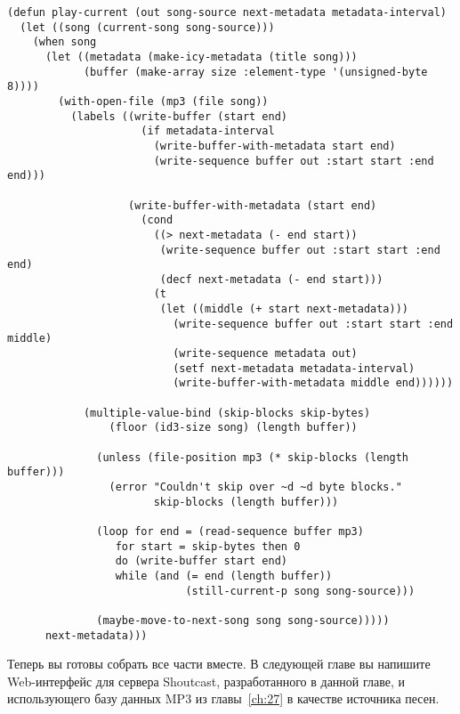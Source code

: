 \begin{lstlisting}
(defun play-current (out song-source next-metadata metadata-interval)
  (let ((song (current-song song-source)))
    (when song
      (let ((metadata (make-icy-metadata (title song)))
            (buffer (make-array size :element-type '(unsigned-byte 8))))
        (with-open-file (mp3 (file song))
          (labels ((write-buffer (start end)
                     (if metadata-interval
                       (write-buffer-with-metadata start end)
                       (write-sequence buffer out :start start :end end)))

                   (write-buffer-with-metadata (start end)
                     (cond
                       ((> next-metadata (- end start))
                        (write-sequence buffer out :start start :end end)
                        (decf next-metadata (- end start)))
                       (t 
                        (let ((middle (+ start next-metadata)))
                          (write-sequence buffer out :start start :end middle)
                          (write-sequence metadata out)
                          (setf next-metadata metadata-interval)
                          (write-buffer-with-metadata middle end))))))

            (multiple-value-bind (skip-blocks skip-bytes)
                (floor (id3-size song) (length buffer))

              (unless (file-position mp3 (* skip-blocks (length buffer)))
                (error "Couldn't skip over ~d ~d byte blocks."
                       skip-blocks (length buffer)))

              (loop for end = (read-sequence buffer mp3) 
                 for start = skip-bytes then 0
                 do (write-buffer start end)
                 while (and (= end (length buffer))
                            (still-current-p song song-source)))

              (maybe-move-to-next-song song song-source)))))
      next-metadata)))
\end{lstlisting}

Теперь вы готовы собрать все части вместе.  В следующей главе вы напишите Web-интерфейс
для сервера Shoutcast, разработанного в данной главе, и использующего базу данных MP3 из
главы~\ref{ch:27} в качестве источника песен.


